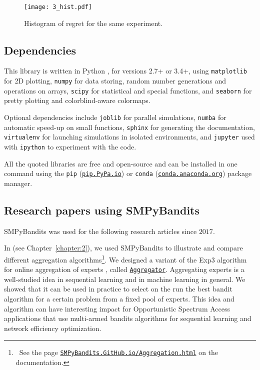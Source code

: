 \begin{figure}[h!]  %
	\centering
	\texttt{[image: 3\_hist.pdf]}
	\caption{Histogram of regret for the same experiment.}
	\label{fig:3:firstPlot_hist}
\end{figure}


\subsection{Dependencies}

This library is written in Python \cite{python}, for versions 2.7+ or 3.4+, using \texttt{matplotlib} \cite{matplotlib} for 2D plotting, \texttt{numpy} \cite{numpy} for data storing, random number generations and operations on arrays, \texttt{scipy} \cite{scipy} for statistical and special functions, and \texttt{seaborn} \cite{seaborn} for pretty plotting and colorblind-aware colormaps.

Optional dependencies include \texttt{joblib} \cite{joblib} for parallel simulations, \texttt{numba} \cite{numba} for automatic speed-up on small functions, \texttt{sphinx} \cite{sphinx} for generating the documentation, \texttt{virtualenv} \cite{virtualenv} for launching simulations in isolated environments, and \texttt{jupyter} \cite{jupyter} used with \texttt{ipython} \cite{ipython} to experiment with the code.

All the quoted libraries are free and open-source and can be installed in one command using the \texttt{pip} (\texttt{\href{https://pip.pypa.io/}{pip.PyPa.io}}) or \texttt{conda} (\texttt{\href{http://conda.anaconda.org/}{conda.anaconda.org}}) package manager.


\subsection{Research papers using SMPyBandits}

SMPyBandits was used for the following research articles since $2017$.

In \cite{Besson2018WCNC} (see Chapter~\ref{chapter:2}), we used SMPyBandits to illustrate and compare different aggregation algorithms\footnote{~See the page \texttt{\href{https://SMPyBandits.GitHub.io/Aggregation.html}{SMPyBandits.GitHub.io/Aggregation.html}} on the documentation.}. We designed a variant of the Exp3 algorithm for online aggregation of experts \cite{Bubeck12}, called \texttt{\href{https://SMPyBandits.GitHub.io/docs/Policies.Aggregator.html}{Aggregator}}. Aggregating experts is a well-studied idea in sequential learning and in machine learning in general. We showed that it can be used in practice to select on the run the best bandit algorithm for a certain problem from a fixed pool of experts. This idea and algorithm can have interesting impact for Opportunistic Spectrum Access applications \cite{Jouini09} that use multi-armed bandits algorithms for sequential learning and network efficiency optimization.

